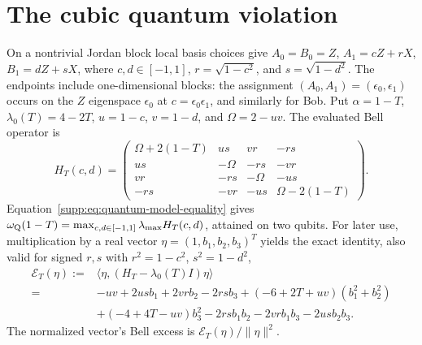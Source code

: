 \documentclass[11pt]{article}
\theoremstyle{remark}\newtheorem{remark}[theorem]{Remark}
\begin{document}
\section{The cubic quantum violation}
\label{supp:sec:endpoint}\label{supp:sec:cubic-scale}
On a nontrivial Jordan block local basis choices give
$A_0=B_0=Z$, $A_1=cZ+rX$, $B_1=dZ+sX$, where
$c,d\in[-1,1]$, $r=\sqrt{1-c^2}$, and $s=\sqrt{1-d^2}$.
The endpoints include one-dimensional blocks: the assignment
$(A_0,A_1)=(\epsilon_0,\epsilon_1)$ occurs on the $Z$ eigenspace
$\epsilon_0$ at $c=\epsilon_0\epsilon_1$, and similarly for Bob.
Put $\alpha=1-T$, $\lambda_0(T)=4-2T$, $u=1-c$, $v=1-d$, and
$\Omega=2-uv$. The evaluated Bell operator is
\begin{equation}
H_T(c,d)=\begin{pmatrix}
\Omega+2(1-T)&us&vr&-rs\\
us&-\Omega&-rs&-vr\\
vr&-rs&-\Omega&-us\\
-rs&-vr&-us&\Omega-2(1-T)
\end{pmatrix}.
\label{supp:eq:block-matrix}
\end{equation}
Equation~\eqref{supp:eq:quantum-model-equality} gives
$\omega_{\rm Q}(1-T)=\max_{c,d\in[-1,1]}\lambda_{\max}H_T(c,d)$,
attained on two qubits. For later use, multiplication by a real vector
$\eta=(1,b_1,b_2,b_3)^T$ yields the exact identity, also valid for signed
$r,s$ with $r^2=1-c^2$, $s^2=1-d^2$,
\begin{align}
\mathcal E_T(\eta):={}&\langle\eta,(H_T-\lambda_0(T)I)\eta\rangle\nonumber\\
={}&-uv+2us b_1+2vr b_2-2rs b_3
+(-6+2T+uv)(b_1^2+b_2^2)\nonumber\\
&+(-4+4T-uv)b_3^2-2rs b_1b_2-2vr b_1b_3-2us b_2b_3.
\label{supp:eq:excess-quadratic-form}
\end{align}
The normalized vector's Bell excess is $\mathcal E_T(\eta)/\|\eta\|^2$.
\end{document}
